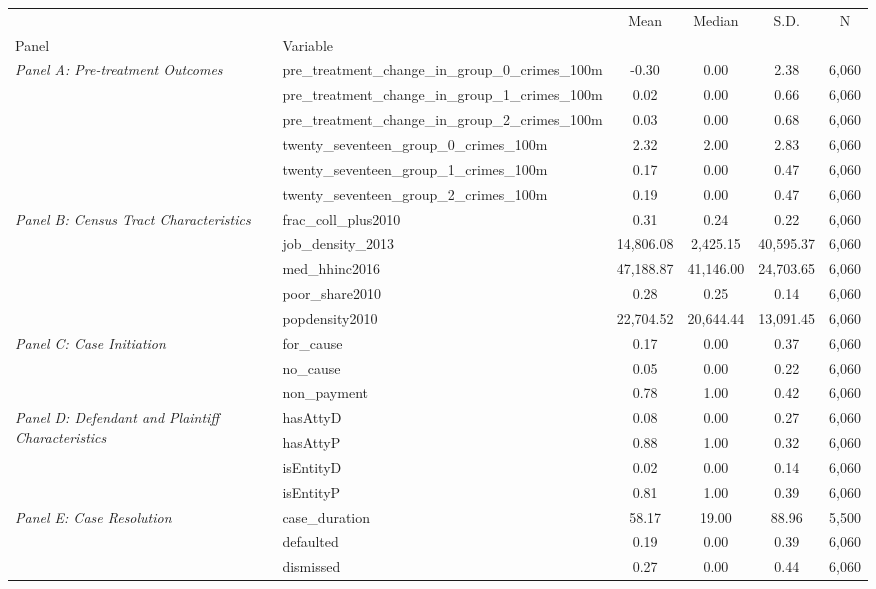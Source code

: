 \begin{tabular}{llcccc}
\toprule
 &  & Mean & Median & S.D. & N \\
Panel & Variable &  &  &  &  \\
\midrule
\multirow[c]{6}{4cm}{\textit{Panel A: Pre-treatment Outcomes}} & pre_treatment_change_in_group_0_crimes_100m & -0.30 & 0.00 & 2.38 & 6,060 \\
 & pre_treatment_change_in_group_1_crimes_100m & 0.02 & 0.00 & 0.66 & 6,060 \\
 & pre_treatment_change_in_group_2_crimes_100m & 0.03 & 0.00 & 0.68 & 6,060 \\
 & twenty_seventeen_group_0_crimes_100m & 2.32 & 2.00 & 2.83 & 6,060 \\
 & twenty_seventeen_group_1_crimes_100m & 0.17 & 0.00 & 0.47 & 6,060 \\
 & twenty_seventeen_group_2_crimes_100m & 0.19 & 0.00 & 0.47 & 6,060 \\
\cline{1-6}
\multirow[c]{5}{4cm}{\textit{Panel B: Census Tract Characteristics}} & frac_coll_plus2010 & 0.31 & 0.24 & 0.22 & 6,060 \\
 & job_density_2013 & 14,806.08 & 2,425.15 & 40,595.37 & 6,060 \\
 & med_hhinc2016 & 47,188.87 & 41,146.00 & 24,703.65 & 6,060 \\
 & poor_share2010 & 0.28 & 0.25 & 0.14 & 6,060 \\
 & popdensity2010 & 22,704.52 & 20,644.44 & 13,091.45 & 6,060 \\
\cline{1-6}
\multirow[c]{3}{4cm}{\textit{Panel C: Case Initiation}} & for_cause & 0.17 & 0.00 & 0.37 & 6,060 \\
 & no_cause & 0.05 & 0.00 & 0.22 & 6,060 \\
 & non_payment & 0.78 & 1.00 & 0.42 & 6,060 \\
\cline{1-6}
\multirow[c]{4}{4cm}{\textit{Panel D: Defendant and Plaintiff Characteristics}} & hasAttyD & 0.08 & 0.00 & 0.27 & 6,060 \\
 & hasAttyP & 0.88 & 1.00 & 0.32 & 6,060 \\
 & isEntityD & 0.02 & 0.00 & 0.14 & 6,060 \\
 & isEntityP & 0.81 & 1.00 & 0.39 & 6,060 \\
\cline{1-6}
\multirow[c]{6}{4cm}{\textit{Panel E: Case Resolution}} & case_duration & 58.17 & 19.00 & 88.96 & 5,500 \\
 & defaulted & 0.19 & 0.00 & 0.39 & 6,060 \\
 & dismissed & 0.27 & 0.00 & 0.44 & 6,060 \\

\end{tabular}
